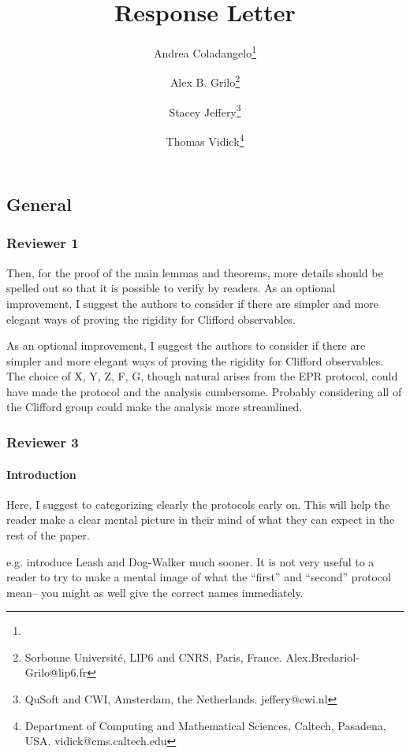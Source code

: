 \documentclass[12pt]{article}
\newcommand{\DW}{{\sf Dog-Walker }}
\newcommand{\Leash}{{\sf Leash }}
\begin{document}
	
	
\title{Response Letter}

\author{Andrea Coladangelo\thanks{}
  \and Alex B. Grilo\thanks{Sorbonne Universit\'{e}, LIP6 and CNRS, Paris, France. Alex.Bredariol-Grilo@lip6.fr}
  \and Stacey Jeffery\thanks{QuSoft and CWI, Amsterdam, the Netherlands. jeffery@cwi.nl} %
  \and Thomas Vidick\thanks{Department of Computing and Mathematical Sciences, Caltech, Pasadena, USA. vidick@cms.caltech.edu}}
\date{}


	\maketitle
\subsection*{General}
\subsubsection*{Reviewer 1}
Then, for the proof of the main lemmas and theorems, more details should be spelled out so that it is possible to verify by readers. As an optional improvement, I suggest the authors to consider if there are simpler and more elegant ways of proving the rigidity for Clifford observables.

As an optional improvement, I suggest the authors to consider if there are simpler and more elegant ways of proving the rigidity for Clifford observables. The choice of {X, Y, Z, F, G}, though natural arises from the EPR protocol, could have made the protocol and the analysis cumbersome. Probably considering all of the Clifford group could make the analysis more streamlined.	


\subsubsection*{Reviewer 3}

\paragraph{Introduction}
Here, I suggest to categorizing clearly the protocols early on.
 This will help the reader make a clear mental picture in their mind of what they can expect in the rest of the paper.

e.g. introduce \Leash and \DW much sooner. It is not very useful to a reader to try to make a mental image of what the ``first'' and ``second'' protocol mean-- you might as well give the correct names immediately.
\end{document}
